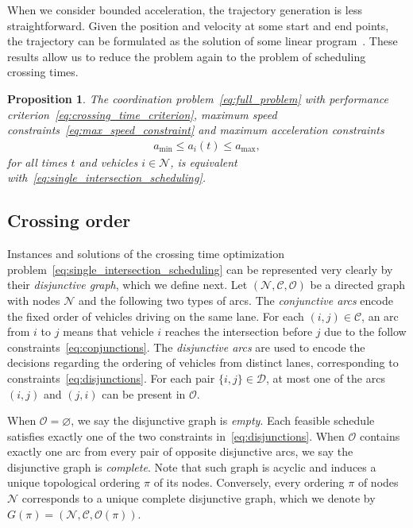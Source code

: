 \documentclass[a4paper]{article}
\theoremstyle{definition}
\theoremstyle{plain}
\newtheorem{proposition}{Proposition}
\begin{document}
When we consider bounded acceleration, the trajectory generation is less
straightforward. Given the position and velocity at some start and end points,
the trajectory can be formulated as the solution of some linear
program~\cite{miculescuPollingsystemsbasedAutonomousVehicle2016}. These
results allow us to reduce the problem again to the problem of scheduling
crossing times.
\begin{proposition}
  The coordination problem~\eqref{eq:full_problem} with performance
  criterion~\eqref{eq:crossing_time_criterion}, maximum speed
  constraints~\eqref{eq:max_speed_constraint} and maximum acceleration
  constraints
  \begin{align*}
    a_{\min} \leq a_{i}(t) \leq a_{\max} ,
  \end{align*}
  for all times $t$ and vehicles $i \in \mathcal{N}$, is equivalent
  with~\eqref{eq:single_intersection_scheduling}.
\end{proposition}


\subsection*{Crossing order}

Instances and solutions of the crossing time optimization problem~\eqref{eq:single_intersection_scheduling} can be
represented very clearly by their \textit{disjunctive graph}, which we define next. Let
$(\mathcal{N}, \mathcal{C}, \mathcal{O})$ be a directed graph with nodes
$\mathcal{N}$ and the following two types of arcs. The \textit{conjunctive arcs} encode
the fixed order of vehicles driving on the same lane. For each
$(i,j) \in \mathcal{C}$, an arc from $i$ to $j$ means that vehicle $i$ reaches the
intersection before $j$ due to the follow constraints~\eqref{eq:conjunctions}. The \textit{disjunctive arcs}
are used to encode the decisions regarding the ordering of vehicles from
distinct lanes, corresponding to constraints~\eqref{eq:disjunctions}. For each pair
$\{i,j\} \in \mathcal{D}$, at most one of the arcs $(i,j)$ and $(j,i)$ can be present
in $\mathcal{O}$.

When $\mathcal{O} = \varnothing$, we say the disjunctive graph is
\textit{empty}. Each feasible schedule satisfies exactly one of the two
constraints in~\eqref{eq:disjunctions}. When $\mathcal{O}$ contains exactly one arc from every pair
of opposite disjunctive arcs, we say the disjunctive graph is \textit{complete}.
Note that such graph is acyclic and induces a unique topological ordering $\pi$
of its nodes. Conversely, every ordering $\pi$ of nodes $\mathcal{N}$ corresponds
to a unique complete disjunctive graph, which we denote by
$G(\pi) = (\mathcal{N}, \mathcal{C}, \mathcal{O}(\pi))$.
\end{document}
